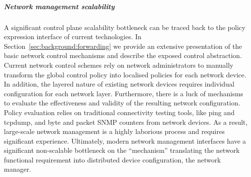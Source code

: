 
\subparagraph*{Network management scalability}

A significant control plane scalability bottleneck can be traced back to the
policy expression interface of current technologies. In
Section~\ref{sec:background:forwarding} we provide an extensive presentation of
the basic network control mechanisms and describe the exposed control
abstraction.  Current network control schemes rely on network administrators to
manually transform the global control policy into localised policies for each
network device. In addition, the layered nature of existing network devices
requires individual configuration for each network layer.  Furthermore, there is
a luck of mechanisms to evaluate the effectiveness and validity of the resulting
network configuration.  Policy evaluation relies on traditional connectivity
testing tools, like ping and tcpdump, and byte and packet SNMP counters from
network devices.  As a result, large-scale network management is a highly
laborious process and requires significant experience. Ultimately, modern
network management interfaces have a significant non-scalable bottleneck on the
``mechanism'' translating the network functional requirement into distributed
device configuration, the network manager.  


